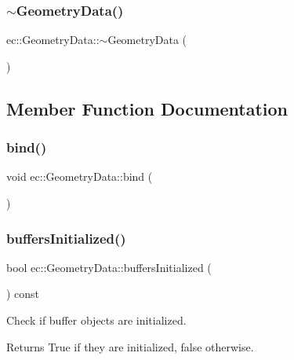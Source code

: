 \subsubsection{\texorpdfstring{$\sim$\+Geometry\+Data()}{~GeometryData()}}
{\footnotesize\ttfamily ec\+::\+Geometry\+Data\+::$\sim$\+Geometry\+Data (\begin{DoxyParamCaption}{ }\end{DoxyParamCaption})}



\subsection{Member Function Documentation}
\mbox{\label{structec_1_1_geometry_data_acb50971e6fbd928172731a3427d22691}} 
\subsubsection{\texorpdfstring{bind()}{bind()}}
{\footnotesize\ttfamily void ec\+::\+Geometry\+Data\+::bind (\begin{DoxyParamCaption}{ }\end{DoxyParamCaption})}

\mbox{\label{structec_1_1_geometry_data_a23c0090061b5b21b74f070916915ca69}} 
\subsubsection{\texorpdfstring{buffers\+Initialized()}{buffersInitialized()}}
{\footnotesize\ttfamily bool ec\+::\+Geometry\+Data\+::buffers\+Initialized (\begin{DoxyParamCaption}{ }\end{DoxyParamCaption}) const}

Check if buffer objects are initialized. \begin{DoxyReturn}{Returns}
True if they are initialized, false otherwise. 
\end{DoxyReturn}
\mbox{\label{structec_1_1_geometry_data_a5a3ba60e2d48de04706168229bdfa87d}} 
